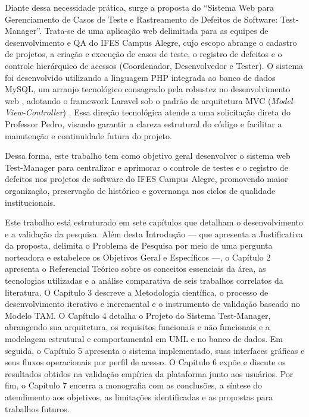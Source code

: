 Diante dessa necessidade prática, surge a proposta do ``Sistema Web para Gerenciamento de Casos de Teste e Rastreamento de Defeitos de Software: Test-Manager''. Trata-se de uma aplicação web delimitada para as equipes de desenvolvimento e QA do IFES Campus Alegre, cujo escopo abrange o cadastro de projetos, a criação e execução de casos de teste, o registro de defeitos e o controle hierárquico de acessos (Coordenador, Desenvolvedor e Tester). O sistema foi desenvolvido utilizando a linguagem PHP integrada ao banco de dados MySQL, um arranjo tecnológico consagrado pela robustez no desenvolvimento web \cite{welling2003}, adotando o framework Laravel sob o padrão de arquitetura MVC (\textit{Model-View-Controller}) \cite{subecz2021}. Essa direção tecnológica atende a uma solicitação direta do Professor Pedro, visando garantir a clareza estrutural do código e facilitar a manutenção e continuidade futura do projeto.

Dessa forma, este trabalho tem como objetivo geral desenvolver o sistema web Test-Manager para centralizar e aprimorar o controle de testes e o registro de defeitos nos projetos de software do IFES Campus Alegre, promovendo maior organização, preservação de histórico e governança nos ciclos de qualidade institucionais.

Este trabalho está estruturado em sete capítulos que detalham o desenvolvimento e a validação da pesquisa. Além desta Introdução --- que apresenta a Justificativa da proposta, delimita o Problema de Pesquisa por meio de uma pergunta norteadora e estabelece os Objetivos Geral e Específicos ---, o Capítulo 2 apresenta o Referencial Teórico sobre os conceitos essenciais da área, as tecnologias utilizadas e a análise comparativa de seis trabalhos correlatos da literatura. O Capítulo 3 descreve a Metodologia científica, o processo de desenvolvimento iterativo e incremental e o instrumento de validação baseado no Modelo TAM. O Capítulo 4 detalha o Projeto do Sistema Test-Manager, abrangendo sua arquitetura, os requisitos funcionais e não funcionais e a modelagem estrutural e comportamental em UML e no banco de dados. Em seguida, o Capítulo 5 apresenta o sistema implementado, suas interfaces gráficas e seus fluxos operacionais por perfil de acesso. O Capítulo 6 expõe e discute os resultados obtidos na validação empírica da plataforma junto aos usuários. Por fim, o Capítulo 7 encerra a monografia com as conclusões, a síntese do atendimento aos objetivos, as limitações identificadas e as propostas para trabalhos futuros.

